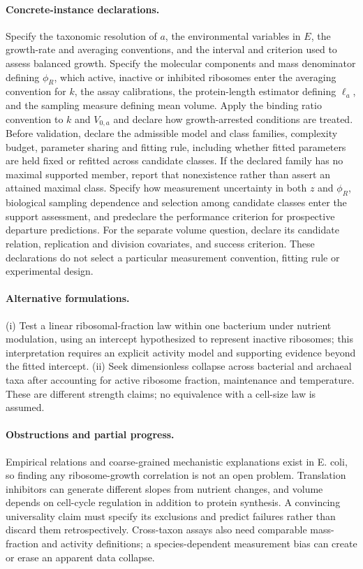 \documentclass[11pt]{article}
\begin{document}
\paragraph{Concrete-instance declarations.} Specify the taxonomic resolution of $a$, the environmental variables in $E$, the growth-rate and averaging conventions, and the interval and criterion used to assess balanced growth. Specify the molecular components and mass denominator defining $\phi_R$, which active, inactive or inhibited ribosomes enter the averaging convention for $k$, the assay calibrations, the protein-length estimator defining $\ell_a$, and the sampling measure defining mean volume. Apply the binding ratio convention to $k$ and $V_{0,a}$ and declare how growth-arrested conditions are treated. Before validation, declare the admissible model and class families, complexity budget, parameter sharing and fitting rule, including whether fitted parameters are held fixed or refitted across candidate classes. If the declared family has no maximal supported member, report that nonexistence rather than assert an attained maximal class. Specify how measurement uncertainty in both $z$ and $\phi_R$, biological sampling dependence and selection among candidate classes enter the support assessment, and predeclare the performance criterion for prospective departure predictions. For the separate volume question, declare its candidate relation, replication and division covariates, and success criterion. These declarations do not select a particular measurement convention, fitting rule or experimental design.

\paragraph{Alternative formulations.} (i) Test a linear ribosomal-fraction law within one bacterium under nutrient modulation, using an intercept hypothesized to represent inactive ribosomes; this interpretation requires an explicit activity model and supporting evidence beyond the fitted intercept. (ii) Seek dimensionless collapse across bacterial and archaeal taxa after accounting for active ribosome fraction, maintenance and temperature. These are different strength claims; no equivalence with a cell-size law is assumed.
\paragraph{Obstructions and partial progress.} Empirical relations and coarse-grained mechanistic explanations exist in E. coli, so finding any ribosome-growth correlation is not an open problem. Translation inhibitors can generate different slopes from nutrient changes, and volume depends on cell-cycle regulation in addition to protein synthesis. A convincing universality claim must specify its exclusions and predict failures rather than discard them retrospectively. Cross-taxon assays also need comparable mass-fraction and activity definitions; a species-dependent measurement bias can create or erase an apparent data collapse.
\end{document}
